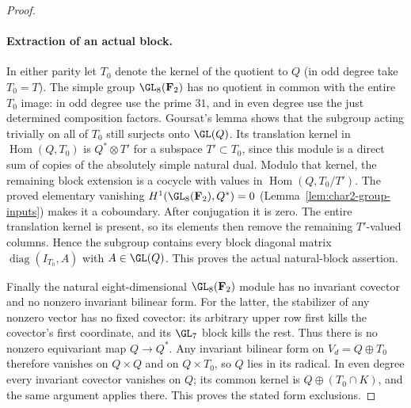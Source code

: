 \begin{proof}
\paragraph{Extraction of an actual block.}
In either parity let $T_0$ denote the kernel of the quotient to $Q$
(in odd degree take $T_0=T$). The simple group $\GL_8(\mathbf F_2)$
has no quotient in common with the entire $T_0$ image: in odd degree
use the prime $31$, and in even degree use the just determined
composition factors. Goursat's lemma shows that the subgroup acting
trivially on all of $T_0$ still surjects onto $\GL(Q)$.
Its translation kernel in $\operatorname{Hom}(Q,T_0)$ is
$Q^*\otimes T'$ for a subspace $T'\subset T_0$, since this module
is a direct sum of copies of the absolutely simple natural dual.
Modulo that kernel, the remaining block extension is a cocycle with
values in $\operatorname{Hom}(Q,T_0/T')$.
The proved elementary vanishing
$H^1(\GL_8(\mathbf F_2),Q^*)=0$
(Lemma~\ref{lem:char2-group-inputs}) makes it a coboundary.
After conjugation it is zero. The entire translation kernel is
present, so its elements then remove the remaining $T'$-valued
columns. Hence the subgroup contains every block diagonal matrix
$\operatorname{diag}(I_{T_0},A)$ with $A\in\GL(Q)$.
This proves the actual natural-block assertion.

Finally the natural eight-dimensional $\GL_8(\mathbf F_2)$ module
has no invariant covector and no nonzero invariant bilinear form.
For the latter, the stabilizer of any nonzero vector has no fixed
covector: its arbitrary upper row first kills the covector's first
coordinate, and its $\GL_7$ block kills the rest. Thus there is
no nonzero equivariant map $Q\to Q^*$.
Any invariant bilinear form on $V_d=Q\oplus T_0$ therefore vanishes
on $Q\times Q$ and on $Q\times T_0$, so $Q$ lies in its radical.
In even degree every invariant covector vanishes on $Q$; its common
kernel is $Q\oplus(T_0\cap K)$, and the same argument applies there.
This proves the stated form exclusions.
\end{proof}

